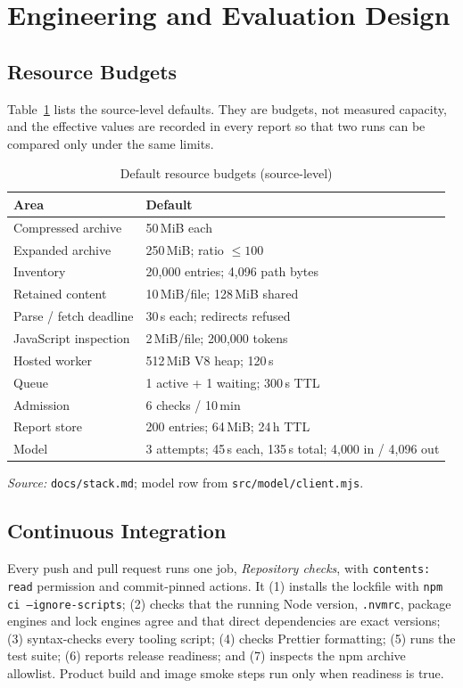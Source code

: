 \documentclass[conference]{IEEEtran}
\newcommand{\code}[1]{\texttt{#1}}
\begin{document}
\section{Engineering and Evaluation Design}\label{sec:eng}

\subsection{Resource Budgets}
Table~\ref{tab:limits} lists the source-level defaults. They are budgets, not
measured capacity, and the effective values are recorded in every report so
that two runs can be compared only under the same limits.

\begin{table}[t]
\caption{Default resource budgets (source-level)}
\label{tab:limits}
\centering
\footnotesize
\begin{tabular}{@{}p{2.9cm}p{4.7cm}@{}}
\toprule
\textbf{Area} & \textbf{Default}\\
\midrule
Compressed archive & 50\,MiB each\\
Expanded archive & 250\,MiB; ratio $\le 100$\\
Inventory & 20{,}000 entries; 4{,}096 path bytes\\
Retained content & 10\,MiB/file; 128\,MiB shared\\
Parse / fetch deadline & 30\,s each; redirects refused\\
JavaScript inspection & 2\,MiB/file; 200{,}000 tokens\\
Hosted worker & 512\,MiB V8 heap; 120\,s\\
Queue & 1 active + 1 waiting; 300\,s TTL\\
Admission & 6 checks / 10\,min\\
Report store & 200 entries; 64\,MiB; 24\,h TTL\\
Model & 3 attempts; 45\,s each, 135\,s total; 4{,}000 in / 4{,}096 out\\
\bottomrule
\end{tabular}
\vspace{1pt}

\textit{Source:} \code{docs/stack.md}; model row from \code{src/model/client.mjs}.
\end{table}

\subsection{Continuous Integration}
Every push and pull request runs one job, \emph{Repository checks}, with
\code{contents: read} permission and commit-pinned actions. It (1) installs
the lockfile with \code{npm ci --ignore-scripts}; (2) checks that the running
Node version, \code{.nvmrc}, package engines and lock engines agree and that
direct dependencies are exact versions; (3) syntax-checks every tooling script;
(4) checks Prettier formatting; (5) runs the test suite; (6) reports release
readiness; and (7) inspects the npm archive allowlist. Product build and image
smoke steps run only when readiness is true.
\end{document}
